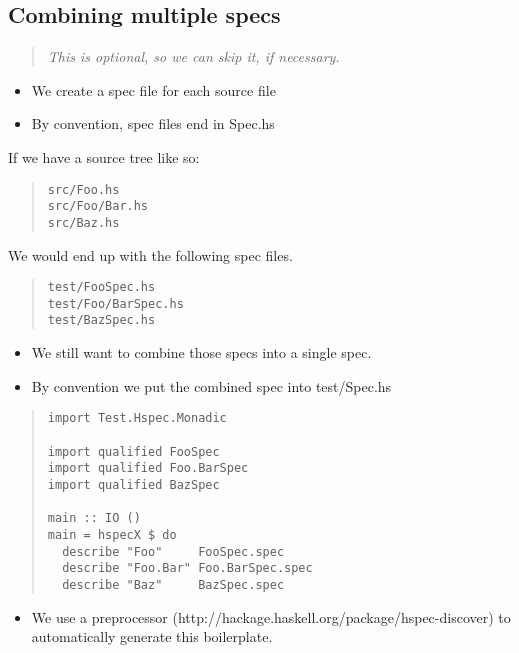 \documentclass[preprint]{sigplanconf}
\begin{document}
\subsection{Combining multiple specs}

\begin{quote}
\emph{This is optional, so we can skip it, if necessary.}
\end{quote}

\begin{itemize}
\item We create a spec file for each source file
\item By convention, spec files end in Spec.hs
\end{itemize}

\noindent If we have a source tree like so:

\begin{quote}
\begin{verbatim}
src/Foo.hs
src/Foo/Bar.hs
src/Baz.hs
\end{verbatim}
\end{quote}

\noindent We would end up with the following spec files.

\begin{quote}
\begin{verbatim}
test/FooSpec.hs
test/Foo/BarSpec.hs
test/BazSpec.hs
\end{verbatim}
\end{quote}

\begin{itemize}
\item We still want to combine those specs into a single spec.
\item By convention we put the combined spec into test/Spec.hs
\end{itemize}

\begin{quote}
\begin{verbatim}
import Test.Hspec.Monadic

import qualified FooSpec
import qualified Foo.BarSpec
import qualified BazSpec

main :: IO ()
main = hspecX $ do
  describe "Foo"     FooSpec.spec
  describe "Foo.Bar" Foo.BarSpec.spec
  describe "Baz"     BazSpec.spec
\end{verbatim}
\end{quote}

\begin{itemize}
\item We use a preprocessor (http://hackage.haskell.org/package/hspec-discover) to automatically generate this boilerplate.
\end{itemize}
\end{document}
